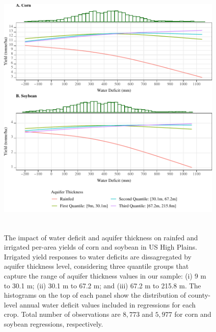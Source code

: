 \documentclass[
]{article}
\begin{document}
\begin{figure}[H]

{\centering \includegraphics[width=6.5in,height=500px,]{../../Figures/g_yield_intensive} 

}

\caption{The impact of water deficit and aquifer thickness on rainfed and irrigated per-area yields of corn and soybean in US High Plains. Irrigated yield responses to water deficits are dissagregated by aquifer thickness level, considering three quantile groups that capture the range of aquifer thickness values in our sample: (i) 9 m to 30.1 m; (ii) 30.1 m to 67.2 m; and (iii) 67.2 m to 215.8 m. The histograms on the top of each panel show the distribution of county-level annual water deficit values included in regressions for each crop. Total number of observations are $8,773$ and $5,977$ for corn and soybean regressions, respectively.}\label{fig:yield-response}
\end{figure}
\end{document}

